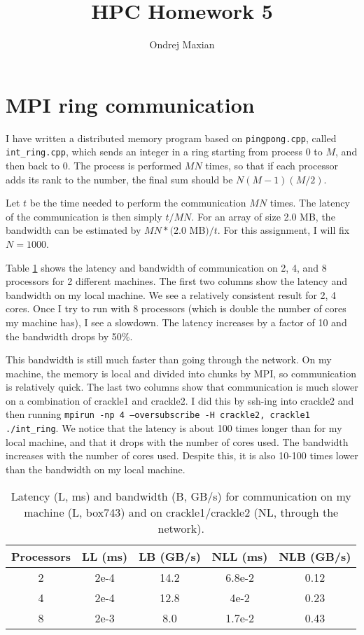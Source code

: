 \documentclass[a4paper]{article}
\title{HPC Homework 5}
\author{Ondrej Maxian}
\begin{document}
\maketitle
\section{MPI ring communication}
I have written a distributed memory program based on \texttt{pingpong.cpp}, called \texttt{int\_ring.cpp}, which sends an integer in a ring starting from process 0 to $M$, and then back to 0. The process is performed $MN$ times, so that if each processor adds its rank to the number, the final sum should be $N(M-1)(M/2)$.

Let $t$ be the time needed to perform the communication $MN$ times. The latency of the communication is then simply $t/MN$. For an array of size 2.0 MB, the bandwidth can be estimated by $MN*(2.0$ MB$)/t$. For this assignment, I will fix $N=1000$. 

Table \ref{tab:t} shows the latency and bandwidth of communication on 2, 4, and 8 processors for 2 different machines. The first two columns show the latency and bandwidth on my local machine. We see a relatively consistent result for 2, 4 cores. Once I try to run with 8 processors (which is double the number of cores my machine has), I see a slowdown. The latency increases by a factor of 10 and the bandwidth drops by 50\%. 

This bandwidth is still much faster than going through the network. On my machine, the memory is local and divided into chunks by MPI, so communication is relatively quick. The last two columns show that communication is much slower on a combination of crackle1 and crackle2. I did this by ssh-ing into crackle2 and then running \texttt{mpirun -np 4 --oversubscribe -H crackle2, crackle1 ./int\_ring}. We notice that the latency is about 100 times longer than for my local machine, and that it drops with the number of cores used. The bandwidth increases with the number of cores used. Despite this, it is also 10-100 times lower than the bandwidth on my local machine. 

\begin{table}[ht]
\centering
\begin{tabular}{c|c|c|c|c}
Processors & LL (ms) & LB (GB/s) & NLL (ms) & NLB (GB/s)\\[2 pt] \hline
2 & 2e-4 & 14.2 & 6.8e-2  & 0.12 \\[2 pt]
4 & 2e-4 & 12.8 & 4e-2 & 0.23 \\[2 pt]
8 & 2e-3 & 8.0 & 1.7e-2 & 0.43
\end{tabular}
\caption{Latency (L, ms) and bandwidth (B, GB/s) for communication on my machine (L, box743) and on crackle1/crackle2 (NL, through the network). }
\label{tab:t}
\end{table}
\end{document}
